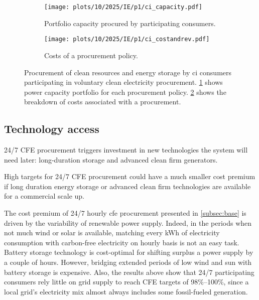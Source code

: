 \begin{figure}
    \centering
    \begin{subfigure}[t]{0.95\columnwidth}
        \centering
        \caption{Portfolio capacity procured by participating consumers.}
        \texttt{[image: plots/10/2025/IE/p1/ci\_capacity.pdf]}
        \label{fig:10-2025-IE-p1-ci_capacity}
    \end{subfigure}
    \begin{subfigure}[t]{0.95\columnwidth}
        \centering
        \vspace{-0.5cm}
        \caption{Costs of a procurement policy.}
        \texttt{[image: plots/10/2025/IE/p1/ci\_costandrev.pdf]}
        \label{fig:10-2025-IE-p1-ci_costandrev}
    \end{subfigure}
    \caption{Procurement of clean resources and energy storage by \gls{ci} consumers participating in voluntary clean electricity procurement. 
    \cref{fig:10-2025-IE-p1-ci_capacity} shows power capacity portfolio for each procurement policy.
    \cref{fig:10-2025-IE-p1-ci_costandrev} shows the breakdown of costs associated with a procurement.}
    \label{fig:10-2025-IE-p1-ci_procurement}
\end{figure}


\subsection{Technology access}
\label{subsec:palette}

\vspace{10pt}
\begin{res}
    24/7 CFE procurement triggers investment in new technologies the system will need later: long-duration storage and advanced clean firm generators.
\end{res}

\vspace*{5pt}
\begin{res}
    High targets for 24/7 CFE procurement could have a much smaller cost premium if long duration energy storage or advanced clean firm technologies are available for a commercial scale up.
\end{res}

The cost premium of 24/7 hourly \gls{cfe} procurement presented in \cref{subsec:base} is driven by the variability of renewable power supply.
Indeed, in the periods when not much wind or solar is available, matching every kWh of electricity consumption with carbon-free electricity on hourly basis is not an easy task.
Battery storage technology is cost-optimal for shifting surplus a power supply by a couple of hours.
However, bridging extended periods of low wind and sun with battery storage is expensive.
Also, the results above show that 24/7 participating consumers rely little on grid supply to reach CFE targets of 98\%--100\%, since a local grid's electricity mix almost always includes some fossil-fueled generation.

